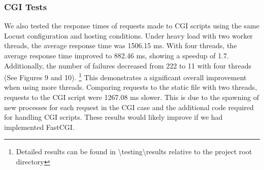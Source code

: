 \subsubsection*{CGI Tests}
We also tested the response times of requests made to CGI scripts using the same Locust configuration and hosting conditions. Under heavy load with two worker threads, the average response time was 1506.15 ms. With four threads, the average response time improved to 882.46 ms, showing a speedup of 1.7. Additionally, the number of failures decreased from 222 to 11 with four threads (See Figures 9 and 10). \footnote{Detailed results can be found in \textbackslash testing\textbackslash results relative to the project root directory}
This demonstrates a significant overall improvement when using more threads. Comparing requests to the static file with two threads, requests to the CGI script were 1267.08 ms slower. This is due to the spawning of new processes for each request in the CGI case and the additional code required for handling CGI scripts. These results would likely improve if we had implemented FastCGI.


